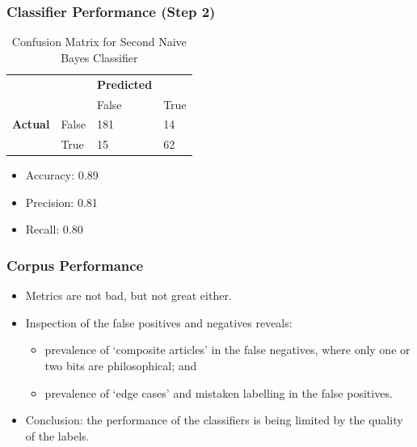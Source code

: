 \documentclass[10pt, compress]{beamer}
\begin{document}
\begin{frame}
	\frametitle{Classifier Performance (Step 2)}

	\pause
	\begin{table}[]
	        \centering
	        \footnotesize
	        \begin{tabular}{ll|ll}
	        & & \textbf{Predicted} & \\
	        & & False & True \\
	        \hline
	        \textbf{Actual} & False & 181 & 14 \\
	        & True & 15 & 62 \\
	        \end{tabular}
	        \caption{Confusion Matrix for Second Naive Bayes Classifier}
	        \label{t:nb2-confusion}
	\end{table}

	\begin{itemize}
		\item Accuracy: 0.89
		\item Precision: 0.81
		\item Recall: 0.80
	\end{itemize}
\end{frame}

\begin{frame}
	\frametitle{Corpus Performance}

	\pause

  \begin{itemize}[<+- | alert@+>]
		\item Metrics are not bad, but not great either.
		\item Inspection of the false positives and negatives reveals:
		\begin{itemize}
			\item prevalence of `composite articles' in the false negatives, where only one or two bits are philosophical; and
			\item prevalence of `edge cases' and mistaken labelling in the false positives.
		\end{itemize}
		\item Conclusion: the performance of the classifiers is being limited by the quality of the labels.
	\end{itemize}

\end{frame}
\end{document}
